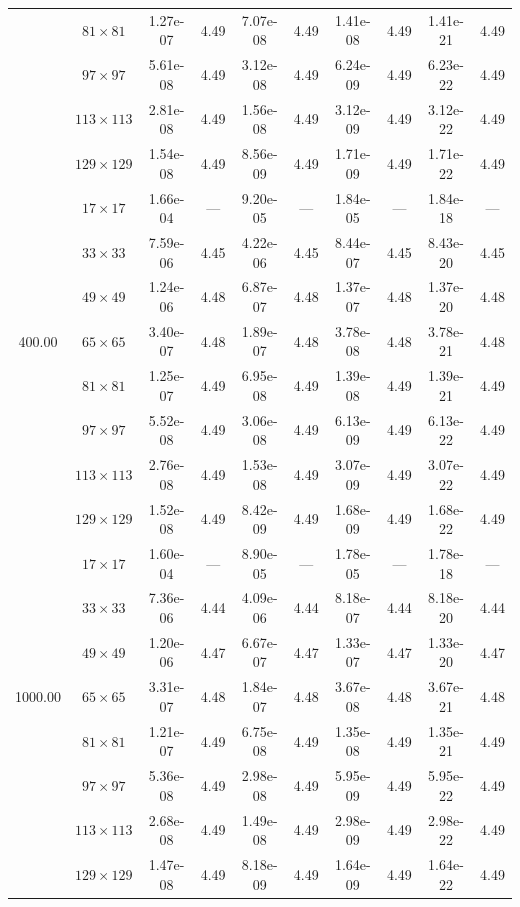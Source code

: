 \documentclass[preprint, 12pt]{elsarticle}
\begin{document}
\begin{center}
\begin{table}[H]
{\begin{tabular*}{\textwidth}{@{\extracolsep\fill}cccccccccc@{}}
    & $81\times 81$ & 1.27e-07 & 4.49 & 7.07e-08 & 4.49 & 1.41e-08 & 4.49 & 1.41e-21 & 4.49 \\
    & $97\times 97$ & 5.61e-08 & 4.49 & 3.12e-08 & 4.49 & 6.24e-09 & 4.49 & 6.23e-22 & 4.49 \\
    & $113\times 113$ & 2.81e-08 & 4.49 & 1.56e-08 & 4.49 & 3.12e-09 & 4.49 & 3.12e-22 & 4.49 \\
    & $129\times 129$ & 1.54e-08 & 4.49 & 8.56e-09 & 4.49 & 1.71e-09 & 4.49 & 1.71e-22 & 4.49 \\
    \hline
    \multirow{7}{*}{400.00} & $17\times 17$ & 1.66e-04 & --- & 9.20e-05 & --- & 1.84e-05 & --- & 1.84e-18 & --- \\
    & $33\times 33$ & 7.59e-06 & 4.45 & 4.22e-06 & 4.45 & 8.44e-07 & 4.45 & 8.43e-20 & 4.45 \\
    & $49\times 49$ & 1.24e-06 & 4.48 & 6.87e-07 & 4.48 & 1.37e-07 & 4.48 & 1.37e-20 & 4.48 \\
    & $65\times 65$ & 3.40e-07 & 4.48 & 1.89e-07 & 4.48 & 3.78e-08 & 4.48 & 3.78e-21 & 4.48 \\
    & $81\times 81$ & 1.25e-07 & 4.49 & 6.95e-08 & 4.49 & 1.39e-08 & 4.49 & 1.39e-21 & 4.49 \\
    & $97\times 97$ & 5.52e-08 & 4.49 & 3.06e-08 & 4.49 & 6.13e-09 & 4.49 & 6.13e-22 & 4.49 \\
    & $113\times 113$ & 2.76e-08 & 4.49 & 1.53e-08 & 4.49 & 3.07e-09 & 4.49 & 3.07e-22 & 4.49 \\
    & $129\times 129$ & 1.52e-08 & 4.49 & 8.42e-09 & 4.49 & 1.68e-09 & 4.49 & 1.68e-22 & 4.49 \\
    \hline
    \multirow{7}{*}{1000.00} & $17\times 17$ & 1.60e-04 & --- & 8.90e-05 & --- & 1.78e-05 & --- & 1.78e-18 & --- \\
    & $33\times 33$ & 7.36e-06 & 4.44 & 4.09e-06 & 4.44 & 8.18e-07 & 4.44 & 8.18e-20 & 4.44 \\
    & $49\times 49$ & 1.20e-06 & 4.47 & 6.67e-07 & 4.47 & 1.33e-07 & 4.47 & 1.33e-20 & 4.47 \\
    & $65\times 65$ & 3.31e-07 & 4.48 & 1.84e-07 & 4.48 & 3.67e-08 & 4.48 & 3.67e-21 & 4.48 \\
    & $81\times 81$ & 1.21e-07 & 4.49 & 6.75e-08 & 4.49 & 1.35e-08 & 4.49 & 1.35e-21 & 4.49 \\
    & $97\times 97$ & 5.36e-08 & 4.49 & 2.98e-08 & 4.49 & 5.95e-09 & 4.49 & 5.95e-22 & 4.49 \\
    & $113\times 113$ & 2.68e-08 & 4.49 & 1.49e-08 & 4.49 & 2.98e-09 & 4.49 & 2.98e-22 & 4.49 \\
    & $129\times 129$ & 1.47e-08 & 4.49 & 8.18e-09 & 4.49 & 1.64e-09 & 4.49 & 1.64e-22 & 4.49 \\
    \hline
    \end{tabular*}
}
\end{table}
\end{center}
\end{document}
